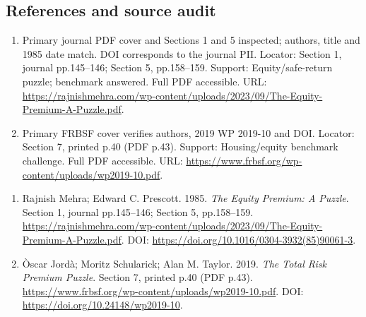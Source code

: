 \documentclass[11pt,a4paper]{article}
\begin{document}
\subsection*{References and source audit}
\begin{enumerate}
\item Primary journal PDF cover and Sections 1 and 5 inspected; authors, title and 1985 date match. DOI corresponds to the journal PII. Locator: Section 1, journal pp.145--146; Section 5, pp.158--159. Support: Equity/safe-return puzzle; benchmark answered. Full PDF accessible. URL: \url{https://rajnishmehra.com/wp-content/uploads/2023/09/The-Equity-Premium-A-Puzzle.pdf}.
\item Primary FRBSF cover verifies authors, 2019 WP 2019-10 and DOI. Locator: Section 7, printed p.40 (PDF p.43). Support: Housing/equity benchmark challenge. Full PDF accessible. URL: \url{https://www.frbsf.org/wp-content/uploads/wp2019-10.pdf}.
\end{enumerate}
\begin{enumerate}\raggedright
\item\hypertarget{definitions:source:30007592:1}{} Rajnish Mehra; Edward C. Prescott. 1985. \emph{The Equity Premium: A Puzzle}. Section 1, journal pp.145--146; Section 5, pp.158--159.
\url{https://rajnishmehra.com/wp-content/uploads/2023/09/The-Equity-Premium-A-Puzzle.pdf}.
DOI: \url{https://doi.org/10.1016/0304-3932(85)90061-3}.
\item\hypertarget{definitions:source:30007592:2}{} Òscar Jordà; Moritz Schularick; Alan M. Taylor. 2019. \emph{The Total Risk Premium Puzzle}. Section 7, printed p.40 (PDF p.43).
\url{https://www.frbsf.org/wp-content/uploads/wp2019-10.pdf}.
DOI: \url{https://doi.org/10.24148/wp2019-10}.
\end{enumerate}
\end{document}
